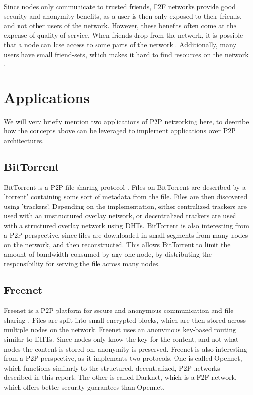 \documentclass[12pt,letterpaper]{article}
\begin{document}
\paragraph{}
Since nodes only communicate to trusted friends, F2F networks provide good security and anonymity benefits, as a user is then only exposed to their friends, and not other users of the network.
However, these benefits often come at the expense of quality of service.
When friends drop from the network, it is possible that a node can lose access to some parts of the network \cite{f2f-avail}.
Additionally, many users have small friend-sets, which makes it hard to find resources on the network \cite{f2f-avail}\cite{f2f-storage}.

\section{Applications}

\paragraph{}
We will very briefly mention two applications of P2P networking here, to describe how the concepts above can be leveraged to implement applications over P2P architectures.

\subsection{BitTorrent}
BitTorrent is a P2P file sharing protocol \cite{wiki-bt}.
Files on BitTorrent are described by a 'torrent' containing some sort of metadata from the file.
Files are then discovered using 'trackers'.
Depending on the implementation, either centralized trackers are used with an unstructured overlay network, or decentralized trackers are used with a structured overlay network using DHTs.
BitTorrent is also interesting from a P2P perspective, since files are downloaded in small segments from many nodes on the network, and then reconstructed.
This allows BitTorrent to limit the amount of bandwidth consumed by any one node, by distributing the responsibility for serving the file across many nodes.

\subsection{Freenet}
Freenet is a P2P platform for secure and anonymous communication and file sharing \cite{freenet}.
Files are split into small encrypted blocks, which are then stored across multiple nodes on the network.
Freenet uses an anonymous key-based routing similar to DHTs.
Since nodes only know the key for the content, and not what nodes the content is stored on, anonymity is preserved.
Freenet is also interesting from a P2P perspective, as it implements two protocols.
One is called Opennet, which functions similarly to the structured, decentralized, P2P networks described in this report.
The other is called Darknet, which is a F2F network, which offers better security guarantees than Opennet.
\end{document}
